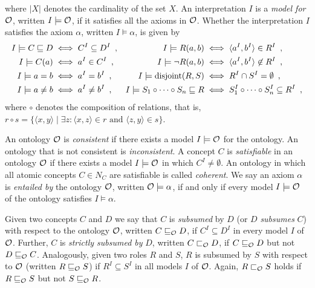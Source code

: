 where $|X|$ denotes the cardinality of the set $X$.
An interpretation $I$ is a \emph{model for} $\mathcal{O}$, written $I \models \mathcal{O}$, if it satisfies all the axioms in $\mathcal{O}$. Whether the interpretation $I$ satisfies the axiom $\alpha$, written $I \models \alpha$, is given by
\begin{align*}
  I \models C \sqsubseteq D &\iff C^I \subseteq D^I \enspace, &
  I \models R(a, b) &\iff \langle a^I, b^I \rangle \in R^I \enspace,\\
  I \models C(a) &\iff a^I \in C^I \enspace, &
  I \models \lnot R(a, b) &\iff \langle a^I, b^I \rangle \not\in R^I \enspace, \\
  I \models a = b &\iff a^I = b^I \enspace, &
  I \models \operatorname{disjoint}(R, S) &\iff R^I \cap S^I = \emptyset \enspace, \\
  I \models a \not= b &\iff a^I \not= b^I \enspace, &
  I \models S_1 \circ \cdots \circ S_n \sqsubseteq R &\iff S_1^I \circ \cdots \circ S_n^I \subseteq R^I \enspace,
\end{align*}
where $\circ$ denotes the composition of relations, that is, $r \circ s = \{ \langle x, y \rangle \mid \exists z : \langle x, z \rangle \in r \text{ and } \langle z, y \rangle \in s \}$.

An ontology $\mathcal{O}$ is \emph{consistent} if there exists a model $I \models \mathcal{O}$ for the ontology. An ontology that is not consistent is \emph{inconsistent}. A concept $C$ is \emph{satisfiable} in an ontology $\mathcal{O}$ if there exists a model $I \models \mathcal{O}$ in which $C^I \not= \emptyset$. An ontology in which all atomic concepts $C \in N_C$ are satisfiable is called \emph{coherent}. We say an axiom $\alpha$ is \emph{entailed by} the ontology $\mathcal{O}$, written $\mathcal{O} \models \alpha$, if and only if every model $I \models \mathcal{O}$ of the ontology satisfies $I \models \alpha$. 

Given two concepts $C$ and $D$ we say that $C$ is \emph{subsumed} by $D$ (or $D$ \emph{subsumes} $C$) with respect to the ontology $\mathcal{O}$, written $C \sqsubseteq_\mathcal{O} D$, if $C^I \subseteq D^I$ in every model $I$ of $\mathcal{O}$. Further, $C$ is \emph{strictly subsumed by} $D$, written $C \sqsubset_\mathcal{O} D$, if $C \sqsubseteq_\mathcal{O} D$ but not $D \sqsubseteq_\mathcal{O} C$. Analogously, given two roles $R$ and $S$, $R$ is subsumed by $S$ with respect to $\mathcal{O}$ (written $R \sqsubseteq_\mathcal{O} S$) if $R^I \subseteq S^I$ in all models $I$ of $\mathcal{O}$. Again, $R \sqsubset_\mathcal{O} S$ holds if $R \sqsubseteq_\mathcal{O} S$ but not $S \sqsubseteq_\mathcal{O} R$.

